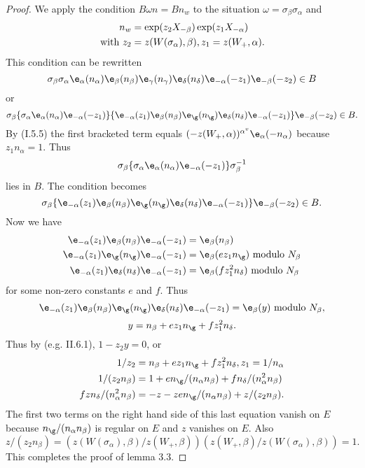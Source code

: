 \documentclass{memo-l}
\theoremstyle{definition}
\theoremstyle{remark}
\numberwithin{section}{chapter}
\numberwithin{equation}{chapter}
\begin{document}
\begin{proof}    We apply the condition $B{\omega}n = Bn_{w}$ to the situation 
${\omega} = {\sigma}_{\beta}{\sigma}_{\alpha}$ and 
$$
\aligned
n_{w} &= \exp(z_{2}X_{-{\beta}})\exp(z_{1}X_{-{\alpha}}) \\
{\text{with}}\ z_{2} &= z(W({\sigma}_{\alpha}),{\beta}), 
z_{1} = z(W_{+},{\alpha}).
\endaligned
$$ 
This condition can be rewritten
$$
{\sigma}_{\beta}{\sigma}_{\alpha}{\e}_{\alpha}(n_{\alpha})
{\e_\beta}(n_\beta)\e_\gamma(n_\gamma)\e_\delta(n_\delta)\e_{-\alpha}
(-z_{1}){\e}_{-{\beta}}(-z_{2}) \in B
$$
or
$$
\sigma_\beta
\{       \sigma_\alpha\e_\alpha(n_\alpha) \e_{-\alpha}(-z_{1})  \}
\{       \e_{-\alpha}(z_1)\e_\beta (n_\beta){\e}_\g(n_\g)\e_\delta (n_\delta)\e_{-\alpha}(-z_1)   \}
\e_{-\beta}(-z_2) 
\in B .
$$ 
By (I.5.5) the first bracketed term equals $(-z(W_{+},{\alpha}))^{\alpha^v}
{\e}_{\alpha}(-n_{\alpha})$ because 
$z_{1}n_{\alpha} = 1$. 
 Thus $${\sigma}_{\beta}\{{\sigma}_{\alpha}{\e}_{\alpha}
(n_{\alpha}){\e}_{-{\alpha}}(-z_{1})\}{\sigma}_{\beta}^{-1}$$ lies 
in $B$. 
 The condition becomes
$$
{\sigma}_{\beta}\{{\e}_{-{\alpha}}(z_{1}){\e}_{\beta}
(n_{\beta}){\e}_{{\g}}(n_{{\g}}){\e}_{{\delta}}
(n_{{\delta}}){\e}_{{-\alpha}}(-z_{1})\}{\e}_{-{\beta}}(-z_{2}) 
\in B.
$$ 
 Now we have
$$
\aligned
{\e}_{-{\alpha}}(z_{1}){\e}_{\beta}(n_{\beta})
{\e}_{-{\alpha}}(-z_{1}) &= {\e}_{\beta}(n_{\beta})\\
{\e}_{-{\alpha}}(z_{1}){\e}_{{\g}}(n_{{\g}})
{\e}_{-{\alpha}}(-z_{1}) &= {\e}_{\beta}(ez_{1}n_{{\g}})\ 
{\text{modulo}}\ N_{\beta} \\
{\e}_{-{\alpha}}(z_{1}){\e}_{{\delta}}(n_{{\delta}})
{\e}_{-{\alpha}}(-z_{1}) &= {\e}_{\beta}(fz_{1}^{2}n_{{\delta}})\
{\text{modulo}}\  N_{\beta}
\endaligned
$$
for some non-zero constants $e$ and $f$.  Thus 
$$
{\e}_{-{\alpha}}(z_{1}){\e}_{\beta}(n_{\beta})
{\e}_{{\g}}(n_\g)\e_\delta(n_\delta)\e_{-\alpha}(-z_{1}) = {\e}_{\beta}(y)\ 
{\text{modulo}}\  N_{\beta} ,
$$
$$
y = n_{\beta} + ez_{1}n_{{\g}} + fz_{1}^{2}n_{{\delta}}.
$$
Thus by (e.g. II.6.1), $1-z_{2}y = 0$, or 
$$
\aligned
1/z_{2} &= n_{\beta} + ez_{1}n_{{\g}} + fz_{1}^{2}n_{{\delta}}, 
z_{1}=1/n_{\alpha} \\
1/(z_{2}n_{\beta}) &= 1 + en_{{\g}}/(n_{\alpha}n_{\beta}) + 
fn_{{\delta}}/(n_{\alpha}^{2}n_{\beta}) \\
fzn_{{\delta}}/(n_{\alpha}^{2}n_{\beta}) &= -z - 
zen_{{\g}}/(n_{\alpha}n_{\beta}) + z/(z_{2}n_{\beta}) .
\endaligned
$$
The first two terms on the right hand side of this last equation vanish on 
$E$ because $n_{{\g}}/(n_{\alpha}n_{\beta})$ is regular on $E$ and 
$z$ vanishes on $E$. 
 Also 
$$
z/(z_{2}n_{\beta}) = (z(W({\sigma}_{\alpha}),
{\beta})/z(W_{+},{\beta}))(z(W_{+},{\beta})/z(W({\sigma}_{\alpha}),
{\beta})) = 1.
$$ 
 This completes the proof of lemma 3.3.
\end{proof} 
\end{document}
